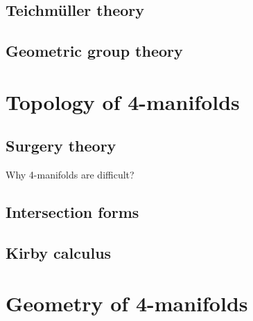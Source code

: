 \documentclass{../../large}
\begin{document}
\chapter{Teichm\"uller theory}
\section{}

\chapter{Geometric group theory}
\section{}


\part{Topology of 4-manifolds}
\chapter{Surgery theory}
Why 4-manifolds are difficult?
\chapter{Intersection forms}
\chapter{Kirby calculus}


\part{Geometry of 4-manifolds}
\chapter{}
\chapter{}
\chapter{}
\end{document}
